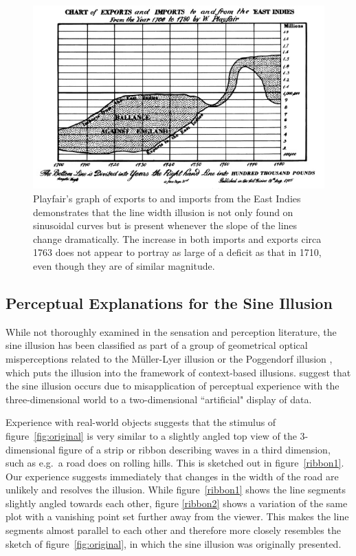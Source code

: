 \documentclass[11pt]{isuthesis}\usepackage[]{graphicx}\usepackage[]{color}
\begin{document}
\begin{figure}[h!tbp]
\centering
\includegraphics[keepaspectratio=TRUE,width=.7\linewidth]{PlayfairExportImports}
\caption[Imports to and Exports from the East Indies in the 1700s]{Playfair's graph of exports to and imports from the East Indies demonstrates that the line width illusion is not only found on sinusoidal curves but is present whenever the slope of the lines change dramatically. The increase in both imports and exports circa 1763 does not appear to portray as large of a deficit as that in 1710, even though they are of similar magnitude.}
\label{fig:playfair-debt}
\end{figure}

\subsection{Perceptual Explanations for the Sine Illusion}\label{perceptualexplanations}\hfill\newline
While not thoroughly examined in the sensation and perception literature, the sine illusion has been classified as part of a group of geometrical optical misperceptions  related to the M\"uller-Lyer illusion \citep{day:1991} or the Poggendorf illusion \citep{poggendorf}, which puts the illusion into the framework of context-based illusions. \citet{day:1991} suggest that the sine illusion occurs due to misapplication of perceptual experience with the three-dimensional world to a two-dimensional ``artificial" display of data.  

Experience with real-world objects suggests that the stimulus of figure~\ref{fig:original} is very similar to a slightly angled top view of the 3-dimensional figure of a strip or ribbon describing waves in a third dimension, such as e.g.~a road does on rolling hills. This is sketched out in figure~\ref{ribbon1}. Our experience suggests immediately that changes in the width of the road are unlikely and resolves the illusion. While figure~\ref{ribbon1} shows the line segments slightly angled towards each other, figure \ref{ribbon2} shows a variation of the same plot with a  vanishing point set further away from the viewer. This makes the line segments almost parallel to each other and therefore more closely resembles the sketch of figure~\ref{fig:original}, in which the sine illusion was originally presented.
\end{document}

